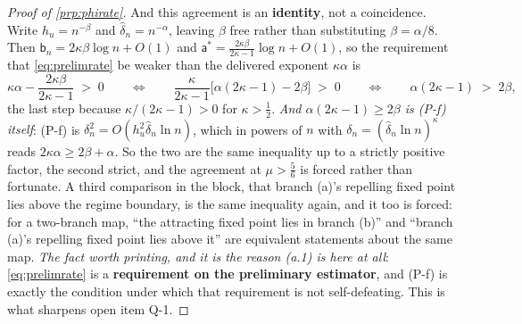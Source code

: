 \begin{proof}[Proof of \cref{prp:phirate}]
And this agreement is an \textbf{identity}, not a coincidence. Write $h_u=n^{-\beta}$ and
$\hat\delta_n=n^{-\alpha}$, leaving $\beta$ free rather than substituting $\beta=\alpha/8$. Then
$\mathsf b_n=2\kappa\beta\log n+O(1)$ and $\mathsf a^{\ast}=\tfrac{2\kappa\beta}{2\kappa-1}\log n+O(1)$,
so the requirement that \eqref{eq:prelimrate} be weaker than the delivered exponent $\kappa\alpha$ is
\[
\kappa\alpha-\frac{2\kappa\beta}{2\kappa-1}\;>\;0
\qquad\Longleftrightarrow\qquad
\frac{\kappa}{2\kappa-1}\Big[\alpha(2\kappa-1)-2\beta\Big]\;>\;0
\qquad\Longleftrightarrow\qquad
\alpha(2\kappa-1)\;>\;2\beta ,
\]
the last step because $\kappa/(2\kappa-1)>0$ for $\kappa>\tfrac12$. \emph{And $\alpha(2\kappa-1)\ge2\beta$
is (P-f) itself}: (P-f) is $\delta_n^{2}=O(h_u^{2}\hat\delta_n\ln n)$, which in powers of $n$ with
$\delta_n=(\hat\delta_n\ln n)^{\kappa}$ reads $2\kappa\alpha\ge2\beta+\alpha$. So the two are the
same inequality up to a strictly positive factor, the second strict, and the agreement at $\mu>\tfrac56$
is forced rather than fortunate. A third comparison in the block, that branch (a)'s repelling fixed
point lies above the regime boundary, is the same inequality again, and it too is forced: for a
two-branch map, ``the attracting fixed point lies in branch (b)'' and ``branch (a)'s repelling fixed
point lies above it'' are equivalent statements about the same map.
\emph{The fact worth printing, and it is the reason (a.1) is here at all}:
\eqref{eq:prelimrate} is a \textbf{requirement on the preliminary estimator}, and (P-f) is exactly the
condition under which that requirement is not self-defeating. This is what sharpens open item Q-1.


\end{proof}
